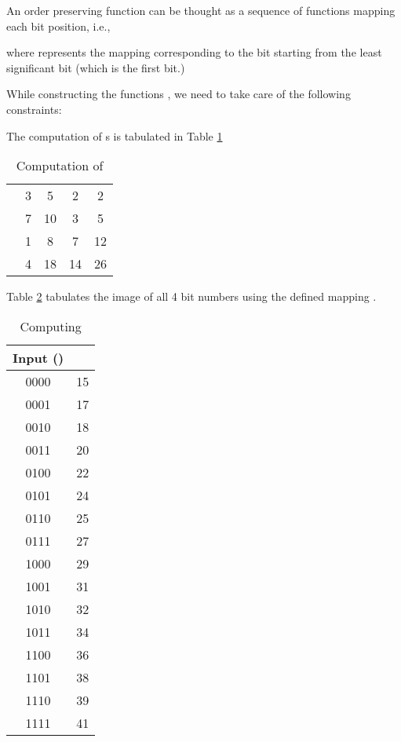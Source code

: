\documentclass[11pt, letterpaper, romanappendices, onecolumn]{article}
\theoremstyle{plain}\newtheorem{thm}{Theorem}[section]
\theoremstyle{definition}
\theoremstyle{remark}
\begin{document}
\par An order preserving function  can be thought as a sequence of functions mapping each bit position, i.e., 

where  represents the mapping corresponding to the  bit starting from the least significant bit (which is the first bit.)
\newline

\par While constructing the functions , we need to take care of the following constraints:


\par The computation of s is tabulated in Table \ref{tab:1}

\begin{table}
	\begin{center}
	\begin{tabular}{|c|c|c|c|c|}
	\hline 
		 &  &  &  &  \\\hline 
		 & 3 & 5 & 2 & 2 \\\hline
		 & 7 & 10 & 3 & 5 \\\hline
		 & 1 & 8 & 7 & 12 \\\hline
		 & 4 & 18 & 14 & 26 \\\hline
	\end{tabular}
	\end{center}
	\caption{Computation of } \label{tab:1}
\end{table}

Table \ref{tab:2} tabulates the image of all 4 bit numbers using the defined mapping . 

\begin{table}
	\begin{center}
	\begin{tabular}{|c|c|}\hline 
		Input () &  \\\hline 
		0000 & 15 \\\hline 
		0001 & 17 \\\hline
		0010 & 18 \\\hline 
		0011 & 20 \\\hline
		0100 & 22 \\\hline
		0101 & 24 \\\hline
		0110 & 25 \\\hline
		0111 & 27 \\\hline
		1000 & 29 \\\hline
		1001 & 31 \\\hline
		1010 & 32 \\\hline
		1011 & 34 \\\hline
		1100 & 36 \\\hline
		1101 & 38 \\\hline
		1110 & 39 \\\hline
		1111 & 41 \\\hline 
	\end{tabular} 
	\end{center}
	\caption{Computing } \label{tab:2}
\end{table}
\end{document}
